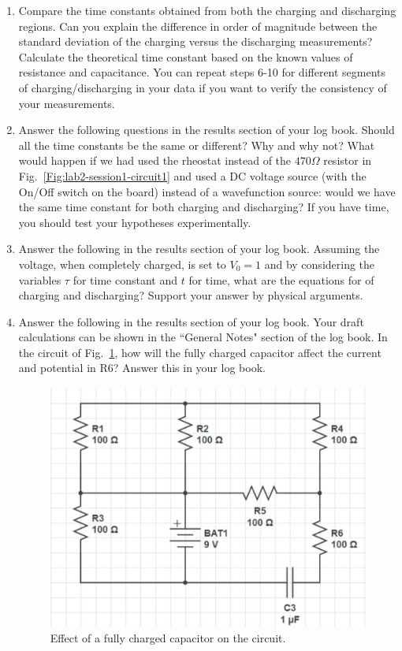 \documentclass[12pt]{report}
\begin{document}
\begin{enumerate}
\item {\color{blue} Compare the time constants obtained from both the charging and discharging regions. 
Can you explain the difference in order of magnitude between the standard deviation of the charging versus the discharging measurements?
Calculate the theoretical time constant based on the known values of resistance and capacitance.} 
You can repeat steps 6-10 for different segments of charging/discharging in your data if you want to verify the consistency of your measurements.

\item {\color{blue}Answer the following questions in the results section of your log book.}  Should all the time constants be the same or different? Why and why not? 
What would happen if we had used the rheostat instead of the $470\Omega$ resistor in Fig.~\ref{Fig:lab2-session1-circuit1} and used a DC voltage source (with the On/Off switch on the board) instead of a wavefunction source: would we have the same time constant for both charging and discharging? 
If you have time, you should test your hypotheses experimentally.

\item {\color{blue}Answer the following in the results section of your log book. }
Assuming the voltage, when completely charged, is set to $V_0 = 1$ and by considering the variables $\tau$ for time constant and $t$ for time, what are the equations for of charging and discharging? 
Support your answer by physical arguments.

\item {\color{blue}Answer the following in the results section of your log book.} Your draft calculations can be shown in the ``General Notes" section of the log book. 
In the circuit of Fig.~\ref{Fig:lab2-session1-Rpractice}, how will the fully charged capacitor affect the current and potential in R6? Answer this in your log book.
\begin{figure}[h]
\centering
\includegraphics[width=0.6\linewidth]{lab2-session1-Rpractice}
\caption{Effect of a fully charged capacitor on the circuit.}
\label{Fig:lab2-session1-Rpractice}
\end{figure}


\end{enumerate}
\end{document}
